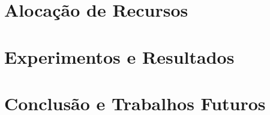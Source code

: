 \documentclass[
	12pt,				%
	openright,			%
	oneside,			%
	a4paper,			%
	chapter=TITLE,		%
	english,			%
	french,				%
	spanish,			%
	brazil				%
	]{abntex2}
\newif\ifisTipoDocumento
\begin{document}
    \chapter[Alocação de Recursos]{Alocação de Recursos}
    
\else
    \chapter[Experimentos e Resultados]{Experimentos e Resultados}
    
\fi


\ifisTipoDocumento
\else
    \chapter[Conclusão e Trabalhos Futuros]{Conclusão e Trabalhos Futuros}
    
\fi


\postextual







\begin{anexosenv}
%
% 
% 
% 
\end{anexosenv}

\printindex
\end{document}
